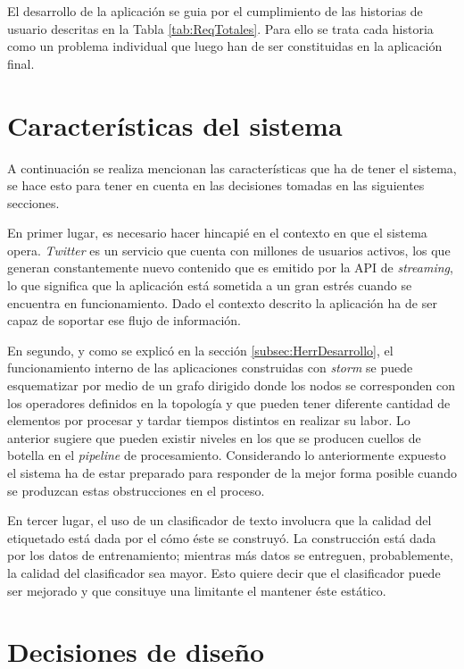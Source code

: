El desarrollo de la aplicación se guia por el cumplimiento de las historias de usuario descritas en la Tabla \ref{tab:ReqTotales}. Para ello se trata cada historia como un problema individual que luego han de ser constituidas en la aplicación final.

\section{Características del sistema}
\label{sec:caracteristicasSistema}

A continuación se realiza mencionan las características que ha de tener el sistema, se hace esto para tener en cuenta en las decisiones tomadas en las siguientes secciones.

En primer lugar, es necesario hacer hincapié en el contexto en que el sistema opera. \textit{Twitter} es un servicio que cuenta con millones de usuarios activos, los que generan constantemente nuevo contenido que es emitido por la API de \textit{streaming}, lo que significa que la aplicación está sometida a un gran estrés cuando se encuentra en funcionamiento. Dado el contexto descrito la aplicación ha de ser capaz de soportar ese flujo de información.

En segundo, y como se explicó en la sección \ref{subsec:HerrDesarrollo}, el funcionamiento interno de las aplicaciones construidas con \textit{storm} se puede esquematizar por medio de un grafo dirigido donde los nodos se corresponden con los operadores definidos en la topología y que pueden tener diferente cantidad de elementos por procesar y tardar tiempos distintos en realizar su labor. Lo anterior sugiere que pueden existir niveles en los que se producen cuellos de botella en el \textit{pipeline} de procesamiento. Considerando lo anteriormente expuesto el sistema ha de estar preparado para responder de la mejor forma posible cuando se produzcan estas obstrucciones en el proceso.

En tercer lugar, el uso de un clasificador de texto involucra que la calidad del etiquetado está dada por el cómo éste se construyó. La construcción está dada por los datos de entrenamiento; mientras más datos se entreguen, probablemente, la calidad del clasificador sea mayor. Esto quiere decir que el clasificador puede ser mejorado y que consituye una limitante el mantener éste estático.

\section{Decisiones de diseño}
\label{sec:decDiseno}

